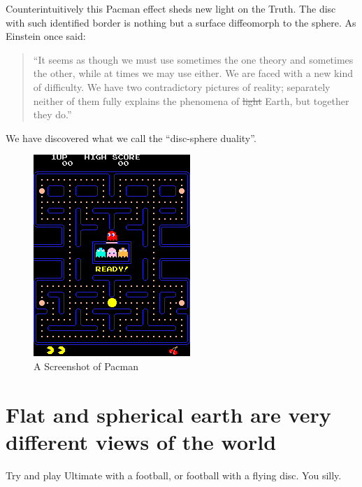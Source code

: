 \documentclass{article}
\begin{document}
Counterintuitively this Pacman effect sheds new light on the Truth. The disc
with such identified border is nothing but a surface diffeomorph to the sphere.
As Einstein once said:

\begin{quote}
``It seems as though we must use sometimes the one theory and sometimes the
other, while at times we may use either. We are faced with a new kind of
difficulty. We have two contradictory pictures of reality; separately neither
of them fully explains the phenomena of \sout{light} Earth, but together they do.''
\end{quote}

We have discovered what we call the ``disc-sphere duality''.

\begin{figure}[ht]
  \centering
  \includegraphics{images/pacman.png}
  \caption{A Screenshot of Pacman}
  \label{fig:pacman-screenshot}
\end{figure}

\section{Flat and spherical earth are very different views of the world}
Try and play Ultimate with a football, or football with a flying disc. You silly.
\end{document}
